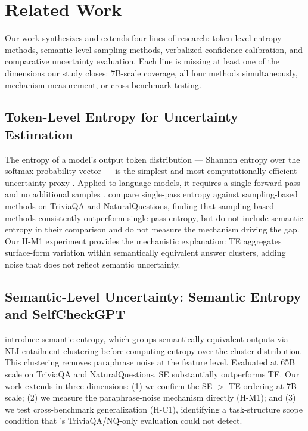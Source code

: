 \section{Related Work}
\label{sec:related}

Our work synthesizes and extends four lines of research: token-level entropy methods, semantic-level sampling methods, verbalized confidence calibration, and comparative uncertainty evaluation.
Each line is missing at least one of the dimensions our study closes: 7B-scale coverage, all four methods simultaneously, mechanism measurement, or cross-benchmark testing.

\subsection{Token-Level Entropy for Uncertainty Estimation}

The entropy of a model's output token distribution --- Shannon entropy over the softmax probability vector --- is the simplest and most computationally efficient uncertainty proxy \citep{Guo2017}.
Applied to language models, it requires a single forward pass and no additional samples \citep{Huang2023}.
\citet{Huang2023} compare single-pass entropy against sampling-based methods on TriviaQA and NaturalQuestions, finding that sampling-based methods consistently outperform single-pass entropy, but do not include semantic entropy in their comparison and do not measure the mechanism driving the gap.
Our H-M1 experiment provides the mechanistic explanation: TE aggregates surface-form variation within semantically equivalent answer clusters, adding noise that does not reflect semantic uncertainty.

\subsection{Semantic-Level Uncertainty: Semantic Entropy and SelfCheckGPT}

\citet{Kuhn2023} introduce semantic entropy, which groups semantically equivalent outputs via NLI entailment clustering before computing entropy over the cluster distribution.
This clustering removes paraphrase noise at the feature level.
Evaluated at 65B scale on TriviaQA and NaturalQuestions, SE substantially outperforms TE.
Our work extends \citet{Kuhn2023} in three dimensions: (1) we confirm the SE $>$ TE ordering at 7B scale; (2) we measure the paraphrase-noise mechanism directly (H-M1); and (3) we test cross-benchmark generalization (H-C1), identifying a task-structure scope condition that \citet{Kuhn2023}'s TriviaQA/NQ-only evaluation could not detect.

